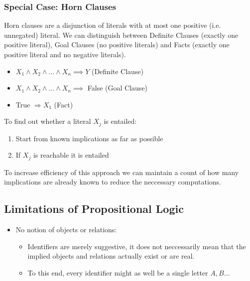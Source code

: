 \documentclass[
../EiKI_Summary.tex,
]
{subfiles}
\begin{document}
\subsubsection*{Special Case: Horn Clauses}
\begin{defbox}
    Horn clauses are a disjunction of literals with at most one positive (i.e. unnegated) literal. We can distinguish between Definite Clauses (exactly one positive literal), Goal Clauses (no positive literals) and Facts (exactly one positive literal and no negative literals).

    \begin{center}
        \begin{itemize}
            \item $X_1 \land X_2 \land \dots \land X_n \implies Y$ (Definite Clause)
            \item $X_1 \land X_2 \land \dots \land X_n \implies$ False (Goal Clause)
            \item True $\Rightarrow X_1$ (Fact)
        \end{itemize}
    \end{center}
\end{defbox}

To find out whether a literal $X_j$ is entailed:
\begin{enumerate}
    \item Start from known implications as far as possible
    \item If $X_j$ is reachable it is entailed
\end{enumerate}

To increase efficiency of this approach we can maintain a count of how many implications are already known to reduce the neccessary computations.

\subsection{Limitations of Propositional Logic}
\begin{itemize}
    \item No notion of objects or relations: 
    \begin{itemize}
        \item Identifiers are merely suggestive, it does not neccessarily mean that the implied objects and relations actually exist or are real.
        \item To this end, every identifier might as well be a single letter $A,B\dots$
    \end{itemize}
\end{itemize}
\end{document}
